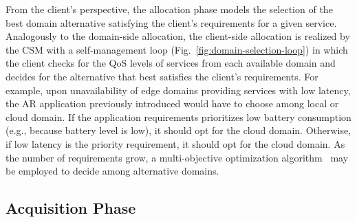 From the client's perspective, the allocation phase models the selection of the best domain alternative satisfying the client's requirements for a given service. 
Analogously to the domain-side allocation, the client-side allocation is realized by the CSM with a self-management loop (Fig.~\ref{fig:domain-selection-loop}) in which the client checks for the QoS levels of services from each available domain and decides for the alternative that best satisfies the client's requirements. 
For example, upon unavailability of edge domains providing services with low latency, the AR application previously introduced would have to choose among local or cloud domain. If the application requirements prioritizes low battery consumption (e.g., because battery level is low), it should opt for the cloud domain. Otherwise, if low latency is the priority requirement, it should opt for the cloud domain. As the number of requirements grow, a multi-objective optimization algorithm~\cite{Olson1996} may be employed to decide among alternative domains.






\subsection*{Acquisition Phase}\label{sec:A3-E-acquisition}


